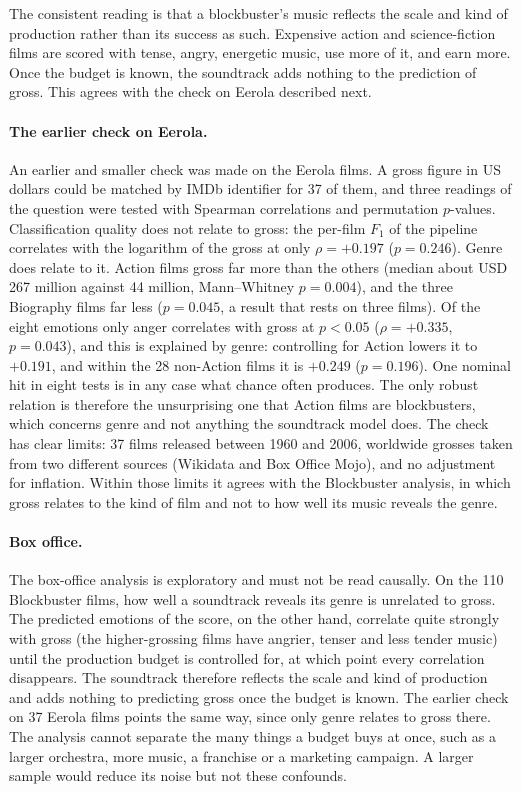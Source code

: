 The consistent reading is that a blockbuster's music reflects the scale and kind of
production rather than its success as such. Expensive action and science-fiction films
are scored with tense, angry, energetic music, use more of it, and earn more. Once the
budget is known, the soundtrack adds nothing to the prediction of gross. This agrees
with the check on Eerola described next.

\paragraph{The earlier check on Eerola.} An earlier and smaller check was made on the
Eerola films. A gross figure in US dollars could be matched by IMDb identifier for 37 of
them, and three readings of the question were tested with Spearman correlations and
permutation $p$-values. Classification quality does not relate to gross: the per-film
$F_1$ of the pipeline correlates with the logarithm of the gross at only $\rho=+0.197$
($p=0.246$). Genre does relate to it. Action films gross far more than the others
(median about USD 267 million against 44 million, Mann--Whitney $p=0.004$), and the
three Biography films far less ($p=0.045$, a result that rests on three films). Of the
eight emotions only anger correlates with gross at $p<0.05$ ($\rho=+0.335$, $p=0.043$),
and this is explained by genre: controlling for Action lowers it to $+0.191$, and within
the 28 non-Action films it is $+0.249$ ($p=0.196$). One nominal hit in eight tests is in
any case what chance often produces. The only robust relation is therefore the
unsurprising one that Action films are blockbusters, which concerns genre and not
anything the soundtrack model does. The check has clear limits: 37 films released between
1960 and 2006, worldwide grosses taken from two different sources (Wikidata and Box
Office Mojo), and no adjustment for inflation. Within those limits it agrees with the
Blockbuster analysis, in which gross relates to the kind of film and not to how well its
music reveals the genre.

\paragraph{Box office.} The box-office analysis is exploratory and must not be read
causally. On the 110 Blockbuster films, how well a soundtrack reveals its genre is
unrelated to gross. The predicted emotions of the score, on the other hand, correlate
quite strongly with gross (the higher-grossing films have angrier, tenser and less tender
music) until the production budget is controlled for, at which point every correlation
disappears. The soundtrack therefore reflects the scale and kind of production and adds
nothing to predicting gross once the budget is known. The earlier check on 37 Eerola films
points the same way, since only genre relates to gross there. The analysis cannot separate
the many things a budget buys at once, such as a larger orchestra, more music, a franchise
or a marketing campaign. A larger sample would reduce its noise but not these confounds.
